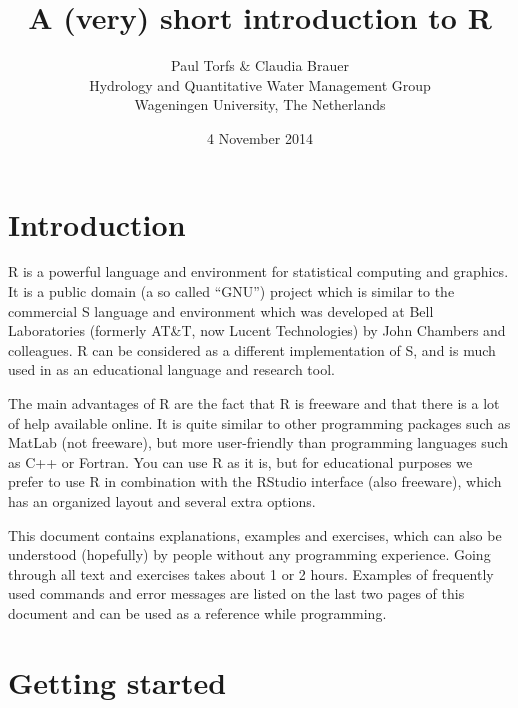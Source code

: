 \documentclass[a4paper,11pt,twocolumn,tablecaptionabove]{scrartcl} %
\title{\vspace{-13mm}A (very) short introduction to R}
\author{Paul Torfs \& Claudia Brauer\\
\footnotesize{Hydrology and Quantitative Water Management Group}\\
\footnotesize{Wageningen University, The Netherlands}}
\date{\small{4 November 2014}}
\begin{document}
\maketitle

\section{Introduction}

R is a powerful language and environment for statistical computing and
graphics. It is a public domain (a so called ``GNU'') project which is
similar to the commercial  S language and environment which was
developed at Bell Laboratories (formerly AT\&T, now Lucent
Technologies) by John Chambers and colleagues. R can be considered as
a different implementation of S, and is much used in as an educational
language and research tool.

The main advantages of R are the fact that R is freeware and that there is a lot of help available online. It is quite similar to other programming packages such as MatLab (not freeware), but more user-friendly than programming languages such as C++ or Fortran. You can use R as it is, but for educational purposes we prefer to use R in combination with the RStudio interface (also freeware), 
which has an organized layout and several extra options. 

This document contains explanations, examples and exercises, which can also be understood (hopefully) by people without any programming experience. Going through all text and exercises takes about 1 or 2 hours. Examples of frequently used commands and error messages are listed on the last two pages of this document and can be used as a reference while programming.


\section{Getting started}

\end{document}
